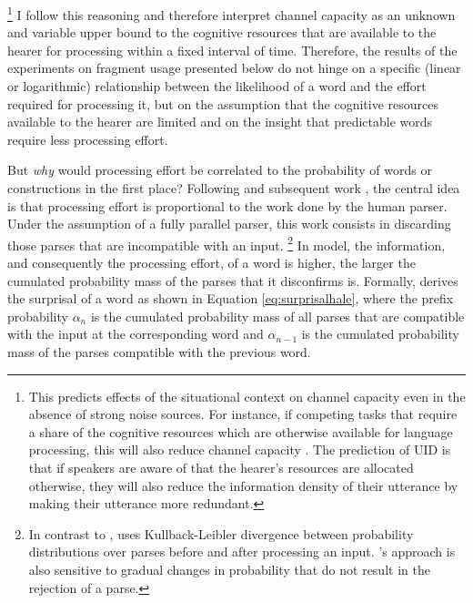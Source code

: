 %
\footnote{This predicts effects of the situational context on channel capacity even in the absence of strong noise sources. For instance, if competing tasks that require a share of the cognitive resources which are otherwise available for language processing, this will also reduce channel capacity \citep{engonopoulos.etal2013,hauser.etal2019}. The prediction of UID is that if speakers are aware of that the hearer's resources are allocated otherwise, they will also reduce the information density of their utterance by making their utterance more redundant.}\afterfn%
%
I follow this reasoning and therefore interpret channel capacity as an unknown and variable upper bound to the cognitive resources that are available to the hearer for processing within a fixed interval of time. Therefore, the results of the experiments on fragment usage presented below do not hinge on a specific (linear or logarithmic) relationship between the likelihood of a word and the effort required for processing it, but on the assumption that the cognitive resources available to the hearer are limited and on the insight that predictable words require less processing effort.

But \textit{why} would processing effort be correlated to the probability of words or constructions in the first place? Following \citet{hale2001} and subsequent work \citep{levy2005, hale2006, levy2008}, the central idea is that processing effort is proportional to the work done by the human parser. Under the assumption of a fully parallel parser, this work consists in discarding those parses that are incompatible with an input.%
%
\footnote{In contrast to \citet{hale2001}, \citet{levy2008} uses Kullback-Leibler divergence between probability distributions over parses before and after processing an input. \citeauthor{levy2008}'s approach is also sensitive to gradual changes in probability that do not result in the rejection of a parse.}\afterfn%
%
In  model, the information, and consequently the processing effort, of a word is higher, the larger the cumulated probability mass of the parses that it disconfirms is. Formally, \citet[162]{hale2001} derives the surprisal of a word as shown in Equation \ref{eq:surprisalhale}, where the prefix probability $\alpha_n$ is the cumulated probability mass of all parses that are compatible with the input at the corresponding word and $\alpha_{n-1}$ is the cumulated probability mass of the parses compatible with the previous word.

